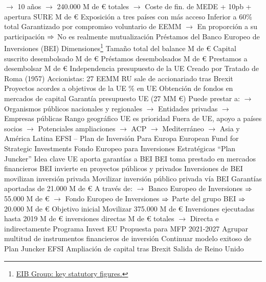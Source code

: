 \documentclass{nuevotema}
\begin{document}
\begin{esquemal}
				\4[] $\to$ 10 años
				\4[] $\to$ 240.000 M de € totales
				\4[] $\to$ Coste de fin. de MEDE + 10pb + apertura
				\4 SURE
				 M de €
				\4[] Exposición a tres países con más acceso
				\4[] Inferior a 60\% total
				\4[] Garantizado por compromiso voluntario de EEMM
				\4[] $\to$ En proporción a su participación
				\4[] $\Rightarrow$ No es realmente mutualización
		\2 Préstamos del Banco Europeo de Inversiones (BEI)
			\3 Dimensiones\footnote{\href{https://www.eib.org/en/about/key_figures/data.htm}{EIB Group: key statutory figures.}}
				\4 Tamaño total del balance
				 M de €
				\4 Capital suscrito desembolsado
				 M de €
				\4 Préstamos desembolsados
				 M de €
				\4 Prestamos a desembolsar
				 M de €
			\3 Independencia presupuesto de la UE
				\4 Creado por Tratado de Roma (1957)
				\4 Accionistas: 27 EEMM
				\4[] RU sale de accionariado tras Brexit
			\3 Proyectos acordes a objetivos de la UE
				\% en UE
				\4 Obtención de fondos en mercados de capital
				\4 Garantía presupuesto UE (27 MM €)
				\4 Puede prestar a:
				\4[] $\to$ Organismos públicos nacionales y regionales
				\4[] $\to$ Entidades privadas
				\4[] $\to$ Empresas públicas
				\4 Rango geográfico
				\4[] UE es prioridad
				\4[] Fuera de UE, apoyo a países socios
				\4[] $\to$ Potenciales ampliaciones
				\4[] $\to$ ACP
				\4[] $\to$ Mediterráneo
				\4[] $\to$ Asia y América Latina
			\3 EFSI -- Plan de Inversión Para Europa
				\4 European Fund for Strategic Investments
				\4[] Fondo Europeo para Inversiones Estratégicas
				\4[] ``Plan Juncker''
				\4 Idea clave
				\4[] UE aporta garantías a BEI
				\4[] BEI toma prestado en mercados financieros
				\4[] BEI invierte en proyectos públicos y privados
				\4[] Inversiones de BEI movilizan inversión privada
				\4 Movilizar inversión público privada vía BEI
				\4[] Garantías aportadas de 21.000 M de €
				\4[] A través de:
				\4[] $\to$ Banco Europeo de Inversiones
				\4[] $\Rightarrow$ 55.000 M de €
				\4[] $\to$ Fondo Europeo de Inversiones
				\4[] $\Rightarrow$ Parte del grupo BEI
				\4[] $\Rightarrow$ 20.000 M de €
				\4 Objetivo inicial
				\4[] Movilizar 375.000 M de €
				\4 Inversiones ejecutadas hasta 2019
				 M de € inversiones directas
				 M de € totales
				\4[] $\to$ Directa e indirectamente
			\3 Programa Invest EU
				\4 Propuesta para MFP 2021-2027
				\4 Agrupar multitud de instrumentos financieros de inversión
				\4 Continuar modelo exitoso de Plan Juncker EFSI
			\3 Ampliación de capital tras Brexit
				\4 Salida de Reino Unido

\end{esquemal}
\end{document}
